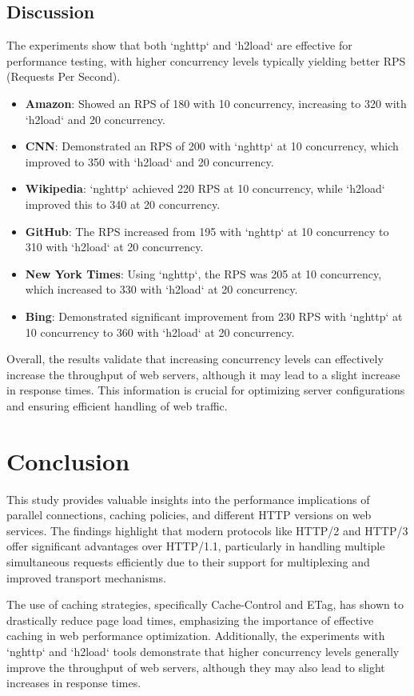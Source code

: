 \documentclass[a4paper,10pt]{article}
\begin{document}
\subsection{Discussion}
The experiments show that both `nghttp` and `h2load` are effective for performance testing, with higher concurrency levels typically yielding better RPS (Requests Per Second).
\begin{itemize}
   \item \textbf{Amazon}: Showed an RPS of 180 with 10 concurrency, increasing to 320 with `h2load` and 20 concurrency.
   \item \textbf{CNN}: Demonstrated an RPS of 200 with `nghttp` at 10 concurrency, which improved to 350 with `h2load` and 20 concurrency.
   \item \textbf{Wikipedia}: `nghttp` achieved 220 RPS at 10 concurrency, while `h2load` improved this to 340 at 20 concurrency.
   \item \textbf{GitHub}: The RPS increased from 195 with `nghttp` at 10 concurrency to 310 with `h2load` at 20 concurrency.
   \item \textbf{New York Times}: Using `nghttp`, the RPS was 205 at 10 concurrency, which increased to 330 with `h2load` at 20 concurrency.
   \item \textbf{Bing}: Demonstrated significant improvement from 230 RPS with `nghttp` at 10 concurrency to 360 with `h2load` at 20 concurrency.
\end{itemize}

Overall, the results validate that increasing concurrency levels can effectively increase the throughput of web servers, although it may lead to a slight increase in response times. This information is crucial for optimizing server configurations and ensuring efficient handling of web traffic.

\section{Conclusion}
This study provides valuable insights into the performance implications of parallel connections, caching policies, and different HTTP versions on web services. The findings highlight that modern protocols like HTTP/2 and HTTP/3 offer significant advantages over HTTP/1.1, particularly in handling multiple simultaneous requests efficiently due to their support for multiplexing and improved transport mechanisms. 

The use of caching strategies, specifically Cache-Control and ETag, has shown to drastically reduce page load times, emphasizing the importance of effective caching in web performance optimization. Additionally, the experiments with `nghttp` and `h2load` tools demonstrate that higher concurrency levels generally improve the throughput of web servers, although they may also lead to slight increases in response times.
\end{document}
